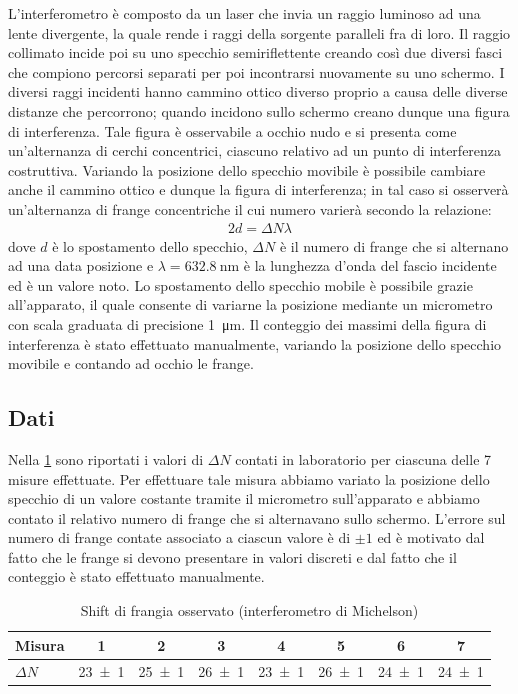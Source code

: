 \documentclass[a4paper]{article}
\begin{document}
L'interferometro è composto da un laser che invia un raggio luminoso ad una lente divergente, la quale rende i raggi della sorgente paralleli fra di loro. Il raggio collimato incide poi su uno specchio semiriflettente creando così due diversi fasci che compiono percorsi separati per poi incontrarsi nuovamente su uno schermo. I diversi raggi incidenti hanno cammino ottico diverso proprio a causa delle diverse distanze che percorrono; quando incidono sullo schermo creano dunque una figura di interferenza. Tale figura è osservabile a occhio nudo e si presenta come un'alternanza di cerchi concentrici, ciascuno relativo ad un punto di interferenza costruttiva. Variando la posizione dello specchio movibile è possibile cambiare anche il cammino ottico e dunque la figura di interferenza; in tal caso si osserverà un'alternanza di frange concentriche il cui numero varierà secondo la relazione: 
\begin{align}
    2d=\Delta N \lambda
\end{align}
dove $d$ è lo spostamento dello specchio, $\Delta N$ è il numero di frange che si alternano ad una data posizione e $\lambda=\SI{632.8}{\nano\meter}$ è la lunghezza d'onda del fascio incidente ed è un valore noto. Lo spostamento dello specchio mobile è possibile grazie all'apparato, il quale consente di variarne la posizione mediante un micrometro con scala graduata di precisione \SI{1}{\micro\meter}. Il conteggio dei massimi della figura di interferenza è stato effettuato manualmente, variando la posizione dello specchio movibile e contando ad occhio le frange.

\subsection{Dati}
Nella \cref{tab:micrometro-michelson} sono riportati i valori di $\Delta N$ contati in laboratorio per ciascuna delle 7 misure effettuate. Per effettuare tale misura abbiamo variato la posizione dello specchio di un valore costante tramite il micrometro sull'apparato e abbiamo contato il relativo numero di frange che si alternavano sullo schermo. L'errore sul numero di frange contate associato a ciascun valore è di $\pm1$ ed è motivato dal fatto che le frange si devono presentare in valori discreti e dal fatto che il conteggio è stato effettuato manualmente. 

\begin{table}[htbp]
\centering
\begin{tabular}{|l|ccccccc|}
\hline
Misura & 1 & 2 & 3 & 4 & 5 & 6 & 7 \\\hline\hline
$\Delta N$ & \num{23 \pm 1} & \num{25 \pm 1} & \num{26 \pm 1} & \num{23 \pm 1} & \num{26 \pm 1} & \num{24 \pm 1} & \num{24 \pm 1} \\\hline
\end{tabular}
\caption{Shift di frangia osservato (interferometro di Michelson)}
\label{tab:micrometro-michelson}
\end{table}
\end{document}
